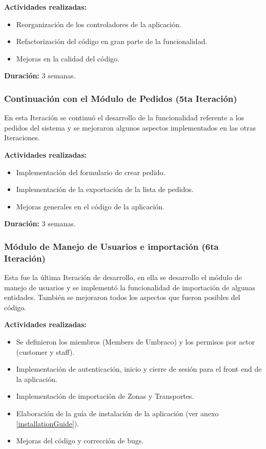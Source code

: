 \textbf{Actividades realizadas:}
\begin{itemize}
    \item Reorganización de los controladores de la aplicación.
    \item Refactorización del código en gran parte de la funcionalidad.
    \item Mejoras en la calidad del código.
\end{itemize}

\textbf{Duración:} 3 semanas.

\subsubsection{Continuación con el Módulo de Pedidos (5ta Iteración)}
En esta Iteración se continuó el desarrollo de la funcionalidad referente a los pedidos del sistema y se mejoraron algunos aspectos implementados en las otras Iteraciones.

\textbf{Actividades realizadas:}
\begin{itemize}
    \item Implementación del formulario de crear pedido.
    \item Implementación de la exportación de la lista de pedidos.
    \item Mejoras generales en el código de la aplicación.
\end{itemize}

\textbf{Duración:} 3 semanas.

\subsubsection{Módulo de Manejo de Usuarios e importación (6ta Iteración)}
Esta fue la última Iteración de desarrollo, en ella se desarrollo el módulo de manejo de usuarios y se implementó la funcionalidad de importación de algunas entidades. También se mejoraron todos los aspectos que fueron posibles del código.

\textbf{Actividades realizadas:}
\begin{itemize}
    \item Se definieron los miembros (Members de Umbraco) y los permisos por actor (customer y staff).
    \item Implementación de autenticación, inicio y cierre de sesión para el front end de la aplicación.
    \item Implementación de importación de Zonas y Transportes.
    \item Elaboración de la guía de instalación de la aplicación (ver anexo \ref{installationGuide}).
    \item Mejoras del código y corrección de bugs.
\end{itemize}

